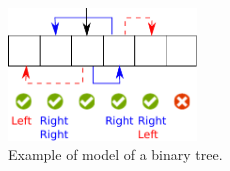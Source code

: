 \documentclass{llncs}
\newcommand{\spark}{SPARK\xspace}
\begin{document}






\begin{figure}[ht]
\vspace{-0.5cm}
\begin{center}
\includegraphics[width=5cm]{model.pdf}
\caption{\label{fig-binary-mod-ex} Example of model of a binary tree.}
\end{center}
\vspace{-0.5cm}
\end{figure}
\end{document}
